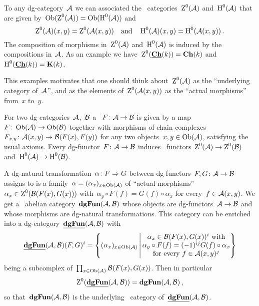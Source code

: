 \documentclass[a4paper,10pt]{scrartcl}
\begin{document}
To any dg-category~$\mathcal{A}$ we can associated the~{\klinear} categories~$\operatorname{Z}^0(\mathcal{A})$ and~$\operatorname{H}^0(\mathcal{A})$ that are given by~$\operatorname{Ob}(\operatorname{Z}^0(\mathcal{A})) = \operatorname{Ob}(\operatorname{H}^0(\mathcal{A}))$ and
\[
  \operatorname{Z}^0(\mathcal{A})(x,y)
  =
  \operatorname{Z}^0(\mathcal{A}(x,y))
  \quad\text{and}\quad
  \operatorname{H}^0(\mathcal{A})(x,y)
  =
  \operatorname{H}^0(\mathcal{A}(x,y)) \,.
\]
The composition of morphisms in~$\operatorname{Z}^0(\mathcal{A})$ and~$\operatorname{H}^0(\mathcal{A})$ is induced by the compositions in~$\mathcal{A}$.
As an example we have~$\operatorname{Z}^0(\underline{\mathbf{Ch}}(k)) = \mathbf{Ch}(k)$ and~$\operatorname{H}^0(\underline{\mathbf{Ch}}(k)) = \mathbf{K}(k)$.

This examples motivates that one should think about~$\operatorname{Z}^0(\mathcal{A})$ as the \enquote{underlying~{\klinear} category of~$\mathcal{A}$}, and as the elements of~$\operatorname{Z}^0(\mathcal{A}(x,y))$ as the \enquote{actual morphisms} from~$x$ to~$y$.

For two dg-categories~$\mathcal{A}$,~$\mathcal{B}$ a ~$F \colon \mathcal{A} \to \mathcal{B}$ is given by a map~$F \colon \operatorname{Ob}(\mathcal{A}) \to \operatorname{Ob}(\mathcal{B})$ together with morphisms of chain complexes~$F_{x,y} \colon \mathcal{A}(x,y) \to \mathcal{B}(F(x), F(y))$ for any two objects~$x, y \in \operatorname{Ob}(\mathcal{A})$, satisfying the usual axioms.
Every dg-functor~$F \colon \mathcal{A} \to \mathcal{B}$ induces~{\klinear} functors~$\operatorname{Z}^0(\mathcal{A}) \to \operatorname{Z}^0(\mathcal{B})$ and~$\operatorname{H}^0(\mathcal{A}) \to \operatorname{H}^0(\mathcal{B})$.

A dg-natural transformation~$\alpha \colon F \Rightarrow G$ between dg-functors~$F, G \colon \mathcal{A} \to \mathcal{B}$ assigns to is a family~$\alpha = (\alpha_x)_{x \in \operatorname{Ob}(\mathcal{A})}$ of \enquote{actual morphisms}~$\alpha_x \in \operatorname{Z}^0(\mathcal{B}(F(x), G(x)))$ with~$\alpha_y \circ F(f) = G(f) \circ \alpha_x$ for every~$f \in \mathcal{A}(x,y)$.
We get a~{\klinear} abelian category~$\mathbf{dgFun}(\mathcal{A}, \mathcal{B})$ whose objects are dg-functors~$\mathcal{A} \to \mathcal{B}$ and whose morphisms are dg-natural transformations.
This category can be enriched into a dg-category~$\underline{\mathbf{dgFun}}(\mathcal{A}, \mathcal{B})$ with
\[
  \dgdgFun(\Acat, \Bcat)(F,G)^i
  =
  \left\{
    (\alpha_x)_{x \in \Ob(\Acat)}
  \suchthat*
    \begin{tabular}{@{}c@{}}
      $\alpha_x \in \Bcat(F(x), G(x))^i$ with \\
      $\alpha_y \circ F(f) = (-1)^{ij} G(f) \circ \alpha_x$ \\
      for every~$f \in \Acat(x,y)^j$
    \end{tabular}
  \right\}
\]
being a subcomplex of~$\prod_{x \in \operatorname{Ob}(\mathcal{A})} \mathcal{B}(F(x), G(x))$.
Then in particular
\[
  \operatorname{Z}^0(\underline{\mathbf{dgFun}}(\mathcal{A}, \mathcal{B}))
  =
  \mathbf{dgFun}(\mathcal{A}, \mathcal{B}) \,,
\]
so that~$\mathbf{dgFun}(\mathcal{A}, \mathcal{B})$ is the underlying~{\klinear} category of~$\underline{\mathbf{dgFun}}(\mathcal{A}, \mathcal{B})$.
\end{document}
